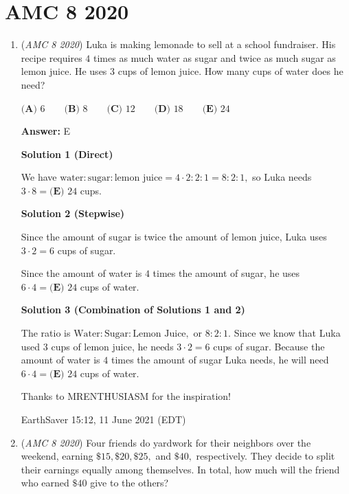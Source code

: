 \section{AMC 8 2020}
        \begin{enumerate}
        	\item (\textit{AMC 8 2020}) Luka is making lemonade to sell at a school fundraiser. His recipe requires $4$ times as much water as sugar and twice as much sugar as lemon juice. He uses $3$ cups of lemon juice. How many cups of water does he need? 


 $\textbf{(A) } 6\qquad\textbf{(B) } 8\qquad\textbf{(C) } 12\qquad\textbf{(D) } 18\qquad\textbf{(E) } 24\qquad$

 \textbf{Answer: }E



\textbf{Solution 1 (Direct)}

We have $\text{water} : \text{sugar} : \text{lemon juice} = 4\cdot 2 : 2 : 1 = 8 : 2 : 1,$ so Luka needs $3 \cdot 8 = \boxed{\textbf{(E) }24}$ cups.

 



\textbf{Solution 2 (Stepwise)}

Since the amount of sugar is twice the amount of lemon juice, Luka uses $3\cdot2=6$ cups of sugar.

 Since the amount of water is $4$ times the amount of sugar, he uses $6\cdot4=\boxed{\textbf{(E) }24}$ cups of water.

 



\textbf{Solution 3 (Combination of Solutions 1 and 2)}

The ratio is $\text{Water}:\text{Sugar}:\text{Lemon Juice},$ or $8:2:1.$ Since we know that Luka used 3 cups of lemon juice, he needs $3\cdot2=6$ cups of sugar. Because the amount of water is $4$ times the amount of sugar Luka needs, he will need $6\cdot4=\boxed{\textbf{(E) }24}$ cups of water.

 Thanks to MRENTHUSIASM for the inspiration!

 EarthSaver 15:12, 11 June 2021 (EDT)

 


	\item (\textit{AMC 8 2020}) Four friends do yardwork for their neighbors over the weekend, earning $\$15, \$20, \$25,$ and $\$40,$ respectively. They decide to split their earnings equally among themselves. In total, how much will the friend who earned $\$40$ give to the others?



\end{enumerate}
